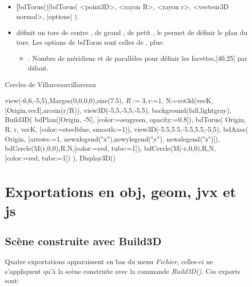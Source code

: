 \begin{itemize}
 \item \util \textbf[bdTorus()]{bdTorus( <point3D>, <rayon R>, <rayon r>, <vecteur3D normal>, [options] )}.
 \item \desc définit un tore de centre , de grand , de petit , le  permet de définir le \og plan du tore\fg. Les options de bdTorus sont celles de , plus:

  \begin{itemize}
  \item {}. Nombre de méridiens et de parallèles pour définir les facettes,[40,25] par défaut.
  \end{itemize}
\end{itemize}

\pngtrue%
\begin{demo}{Cercles de Villarceau}{villarceau}
\begin{texgraph}[name=villarceau,export=eps]
view(-6,6,-5,5),Marges(0,0,0,0),size(7.5),
$R:=3, $r:=1, 
N:=rot3d(vecK,[Origin,vecI],arcsin(r/R)),
view3D(-5,5,-5,5,-5,5), 
background(full,lightgray),
Build3D(
 bdPlan([Origin, -N], 
  [color:=seagreen, opacity:=0.8]),
 bdTorus( Origin, R, r, vecK, 
  [color:=steelblue, smooth:=1]),
 view3D(-5.5,5.5,-5.5,5.5,-5,5),
 bdAxes( Origin, 
  [arrows:=1, newxlegend("x"),newylegend("y"),
   newzlegend("z")]),
 bdCercle(M(r,0,0),R,N,[color:=red, tube:=1]),
 bdCercle(M(-r,0,0),R,N,[color:=red, tube:=1])
    ),
Display3D()
\end{texgraph}
\end{demo}
\pngfalse

\section{Exportations en obj, geom, jvx et js}

\subsection{Scène construite avec Build3D}

Quatre exportations apparaissent en bas du menu \textit{Fichier}, celles-ci ne s'appliquent qu'à la scène
construite avec la commande \textsl{Build3D()}. Ces exports sont:

